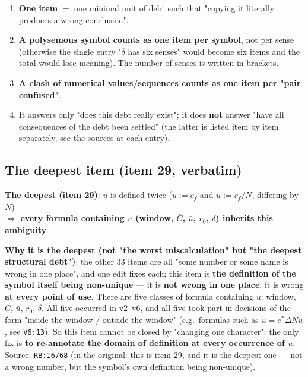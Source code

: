 \documentclass[11pt,a4paper]{article}
\newcommand{\rO}{r_0}
\newcommand{\Cbar}{\bar{C}}
\newcommand{\ubar}{\bar{u}}
\begin{document}
\begin{enumerate}[leftmargin=1.6em,itemsep=2pt,topsep=2pt]
  \item \textbf{One item} $=$ one minimal unit of debt such that "copying it literally produces a wrong conclusion".
  \item \textbf{A polysemous symbol counts as one item per symbol}, not per sense (otherwise the single entry "$\delta$ has six senses" would become six items and the total would lose meaning). The number of senses is written in brackets.
  \item \textbf{A clash of numerical values/sequences counts as one item per "pair confused"}.
  \item It answers only "does this debt really exist"; it does \textbf{not} answer "have all consequences of the debt been settled" (the latter is listed item by item separately, see the sources at each entry).
\end{enumerate}

\subsection{The deepest item (item 29, verbatim)}

\begin{tcolorbox}[colback=cNG!4,colframe=cNG!65,boxrule=0.7pt,arc=2pt,left=8pt,right=8pt,top=6pt,bottom=6pt,breakable]
\textbf{The deepest (item 29)}: $u$ is defined twice ($u:=c_f$ and $u:=c_f/N$, differing by $N$)\\
$\Rightarrow$ \textbf{every formula containing $u$ (window, $\Cbar$, $\ubar$, $r_0$, $\delta$) inherits this ambiguity}
\end{tcolorbox}

\noindent\textbf{Why it is the deepest (not "the worst miscalculation" but "the deepest structural debt")}: the other 33 items are all "some number or some name is wrong in one place", and one edit fixes each; this item is \textbf{the definition of the symbol itself being non-unique} --- it is \textbf{not wrong in one place}, it is wrong \textbf{at every point of use}. There are five classes of formula containing $u$: window, $\Cbar$, $\ubar$, $\rO$, $\delta$. All five occurred in v2--v6, and all five took part in decisions of the form "inside the window / outside the window" (e.g.\ formulas such as $\ubar=e^\ast\Delta N u$, see \texttt{V6:13}). So this item cannot be closed by "changing one character"; the only fix is \textbf{to re-annotate the domain of definition at every occurrence of $u$}. Source: \texttt{RB:16768} (in the original: this is item 29, and it is the deepest one --- not a wrong number, but the symbol's own definition being non-unique).
\end{document}
